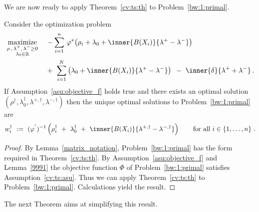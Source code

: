 We are now ready 
to apply Theorem~\ref{cv:ts:th}
to Problem~\ref{bw:1:primal}. 
\begin{lemma}
  Consider the optimization problem
\begin{align}
  \label{9993}
  \begin{split}
  \underset
  {\begin{smallmatrix}
\rho\,,\, \lambda^+,\,\lambda^-\ge 0 \\
\lambda_0\in\R
  \end{smallmatrix}}
  {
    \mathrm{maximize}
  }
  \quad
  &
  -
\sum_{i=1} 
  ^n
    \,
  \varphi^*
  \!
  \left( 
    \rho_i
    +
\lambda_0
+
\inner
{B(X_i)}
{
\lambda^+
-
\lambda^-
}
  \right)
  \\
  &
+
\ 
\sum_{i=1}^{N} 
  \left( 
\lambda_0
+
\inner
{B(X_i)}
{
\lambda^+
-
\lambda^-
}
  \right)
  \,
  \ 
-
\ 
\inner
{\delta}
{
\lambda^+
+
\lambda^-
}
  \,.
  \end{split}
\end{align}
If Assumption~\ref{asu:objective_f} holds true 
and there exists an optimal solution 
$
(\rho^\dagger,\lambda_0^\dagger,\lambda^{+,\dagger},\lambda^{-,\dagger})
$
then the unique optimal solutions to Problem~\ref{bw:1:primal} are 
\begin{gather*}
  w^\dagger_i
  \ 
  :=
  \ 
  (
  \varphi^{'}
  )^{-1}
  \left(
    \rho^\dagger_i
  \ 
    +
  \ 
\lambda_0^\dagger
  \ 
+
  \ 
\inner
{B(X_i)}
{
  \lambda^{+,\dagger}
-
\lambda^{-,\dagger}
}
  \right)
  \qquad
  \text{for all}\ 
  i\in
  \left\{ 1,\ldots,n \right\}
  \,.
\end{gather*}
\end{lemma}
\begin{proof}
  By Lemma~\ref{matrix_notation},
  Problem~\ref{bw:1:primal} has the form required in Theorem~\ref{cv:ts:th}.
  By Assumption~\ref{asu:objective_f} and Lemma~\ref{9991} the objective function $\Phi$ of Problem~\ref{bw:1:primal}
  satisfies Assumption~\ref{cv:ts:asu}.
  Thus we can apply
  Theorem~\ref{cv:ts:th} to Problem~\ref{bw:1:primal}.
  Calculations yield the result.
\end{proof}

The next Theorem aims at simplifying this result. 


